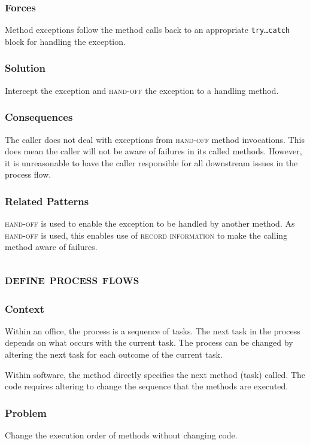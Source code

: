 \documentclass[prodmode]{style/acmlarge}
\begin{document}
\subsubsection*{Forces} Method exceptions follow the method calls back to an
appropriate \texttt{try\ldots catch} block for handling the exception.

\subsubsection*{\textbf{Solution}} Intercept the exception and \textsc{hand-off} the
exception to a handling method.

\subsubsection*{Consequences} The caller does not deal with exceptions from
\textsc{hand-off} method invocations.  This does mean the caller will not be
aware of failures in its called methods.  However, it is unreasonable to have
the caller responsible for all downstream issues in the process flow.

\subsubsection*{Related Patterns} \textsc{hand-off} is used to enable the
exception to be handled by another method.  As \textsc{hand-off} is used, this
enables use of \textsc{record information} to make the calling method aware of
failures.



\subsection{\textsc{\textbf{define process flows}}}

\subsubsection*{Context} Within an office, the process is a sequence of tasks.
The next task in the process depends on what occurs with the current task.  The
process can be changed by altering the next task for each outcome of the current
task.

Within software, the method directly specifies the next method (task) called. 
The code requires altering to change the sequence that the methods are executed.

\subsubsection*{\textbf{Problem}} Change the execution order of methods without changing
code.
\end{document}
